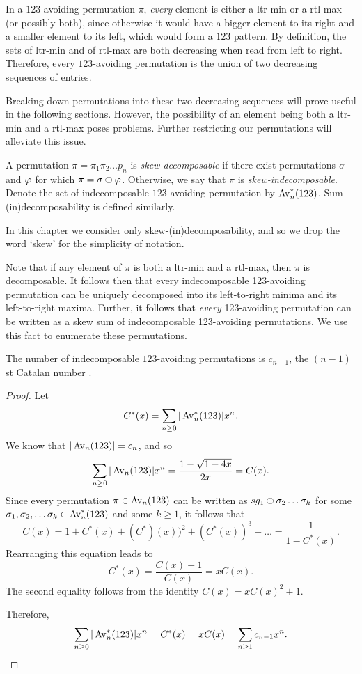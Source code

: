     In a $123$-avoiding permutation $\pi$, \emph{every} element is either a
    ltr-min or a rtl-max (or possibly both), since otherwise it would have a bigger
    element to its right and a smaller element to its left, which would form a
    $123$ pattern. By definition, the sets of ltr-min and of rtl-max are both
    decreasing when read from left to right. Therefore, every $123$-avoiding
    permutation is the union of two decreasing sequences of entries. 

    Breaking down permutations into these two decreasing sequences will prove
    useful in the following sections. However, the possibility of an element
    being both a ltr-min and a rtl-max poses problems. Further restricting our
    permutations will alleviate this issue. 

    \begin{definition} \label{def:indecomposable}
      A permutation $\pi = \pi_1 \pi_2 \dots p_n$ is \emph{skew-decomposable}  if
      there exist permutations $\sigma$ and $\varphi$ for which $\pi = \sigma \ominus \varphi$.
      Otherwise, we say that $\pi$ is \emph{skew-indecomposable}.  Denote the set of
      indecomposable $123$-avoiding permutation by $\operatorname{{Av}}_n^*(123)$. 
      Sum (in)decomposability is defined similarly. 
    \end{definition}
    
    In this chapter we consider only
    skew-(in)decomposability, and so we drop the word `skew' for the simplicity
    of notation. 

    Note that if any element of $\pi$ is both a ltr-min and a rtl-max, then $\pi$
    is decomposable. It follows then that every indecomposable 123-avoiding
    permutation can be uniquely decomposed into its left-to-right minima and its
    left-to-right maxima. Further, it follows that \emph{every} 123-avoiding
    permutation can be written as a skew sum of indecomposable 123-avoiding
    permutations. We use this fact to enumerate these permutations.

    \begin{proposition} \label{expat:prop:indecomposable}
      The number of indecomposable $123$-avoiding permutations is $c_{n-1}$, the
      $(n-1)$st Catalan number .
    \end{proposition}
    \begin{proof}
      Let 
      $$ C^*(x) = \sum_{n \geq 0} |\operatorname{{Av}}_n^*(123)| x^n.$$
      We know that $|\operatorname{{Av}}_n(123)| = c_n$, and so 
      $$ \sum_{n \geq 0} |\operatorname{{Av}}_n(123)| x^n = \frac{1 - \sqrt{1-4x}}{2x} = C(x).$$
      Since every permutation $\pi \in \operatorname{{Av}}_n(123)$ can be written as $sg_1 \ominus \sigma_2
      \dots \sigma_k$ for some $\sigma_1, \sigma_2, \dots \sigma_k \in \operatorname{{Av}}_n^*(123)$ and some $k
      \geq 1$, it follows that 
      $$ C(x) = 1 + C^*(x) + (C^*)(x))^2 + (C^*(x))^3 + \dots 
        = \frac{1}{1 - C^*(x)}.$$
      Rearranging this equation leads to 
      $$ C^*(x) = \frac{C(x) - 1}{C(x)} = xC(x).$$
      The second equality follows from the identity $C(x) = xC(x)^2 + 1$. 

      Therefore, 
      $$ \sum_{n \geq 0} |\operatorname{{Av}}_n^*(123)|x^n = C^*(x) = xC(x) = \sum_{n \geq 1}
      c_{n-1}x^n.$$
    \end{proof}
      

